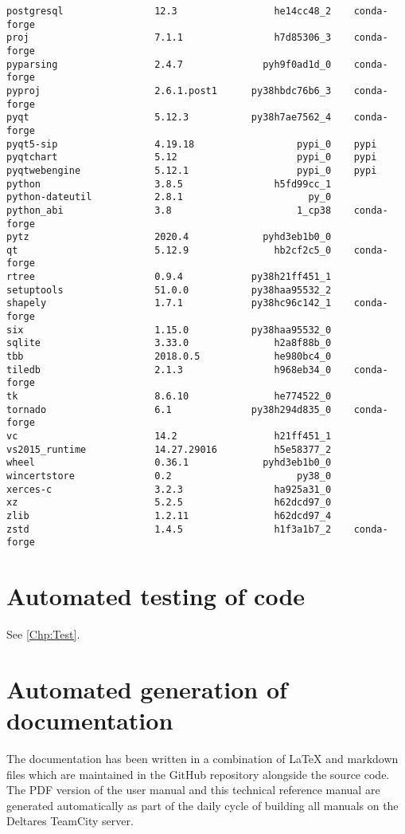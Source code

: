 \begin{Verbatim}
postgresql                12.3                 he14cc48_2    conda-forge
proj                      7.1.1                h7d85306_3    conda-forge
pyparsing                 2.4.7              pyh9f0ad1d_0    conda-forge
pyproj                    2.6.1.post1      py38hbdc76b6_3    conda-forge
pyqt                      5.12.3           py38h7ae7562_4    conda-forge
pyqt5-sip                 4.19.18                  pypi_0    pypi
pyqtchart                 5.12                     pypi_0    pypi
pyqtwebengine             5.12.1                   pypi_0    pypi
python                    3.8.5                h5fd99cc_1
python-dateutil           2.8.1                      py_0
python_abi                3.8                      1_cp38    conda-forge
pytz                      2020.4             pyhd3eb1b0_0
qt                        5.12.9               hb2cf2c5_0    conda-forge
rtree                     0.9.4            py38h21ff451_1
setuptools                51.0.0           py38haa95532_2
shapely                   1.7.1            py38hc96c142_1    conda-forge
six                       1.15.0           py38haa95532_0
sqlite                    3.33.0               h2a8f88b_0
tbb                       2018.0.5             he980bc4_0
tiledb                    2.1.3                h968eb34_0    conda-forge
tk                        8.6.10               he774522_0
tornado                   6.1              py38h294d835_0    conda-forge
vc                        14.2                 h21ff451_1
vs2015_runtime            14.27.29016          h5e58377_2
wheel                     0.36.1             pyhd3eb1b0_0
wincertstore              0.2                      py38_0
xerces-c                  3.2.3                ha925a31_0
xz                        5.2.5                h62dcd97_0
zlib                      1.2.11               h62dcd97_4
zstd                      1.4.5                h1f3a1b7_2    conda-forge
\end{Verbatim}

\section{Automated testing of code}

See \autoref{Chp:Test}.

\section{Automated generation of documentation}

The documentation has been written in a combination of LaTeX and markdown files which are maintained in the GitHub repository alongside the source code.
The PDF version of the user manual and this technical reference manual are generated automatically as part of the daily cycle of building all manuals on the Deltares TeamCity server.